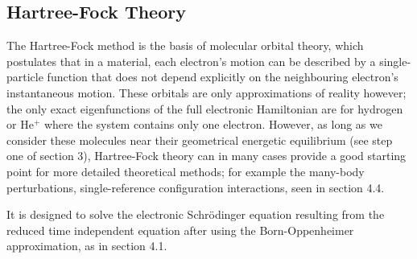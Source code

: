 \documentclass[10pt]{article}
\begin{document}
\subsection{Hartree-Fock Theory}
The Hartree-Fock method is the basis of molecular orbital theory, which postulates that in a material, each electron's motion can be described by a single-particle function that does not depend explicitly on the neighbouring electron's instantaneous motion. These orbitals are only approximations of reality however; the only exact eigenfunctions of the full electronic Hamiltonian are for hydrogen or He$^+$ where the system contains only one electron. However, as long as we consider these molecules near their geometrical energetic equilibrium (see step one of section 3), Hartree-Fock theory can in many cases provide a good starting point for more detailed theoretical methods; for example the many-body perturbations, single-reference configuration interactions, seen in section 4.4. 

It is designed to solve the electronic Schrödinger equation resulting from the reduced time independent equation after using the Born-Oppenheimer approximation, as in section 4.1. %



\end{document}
